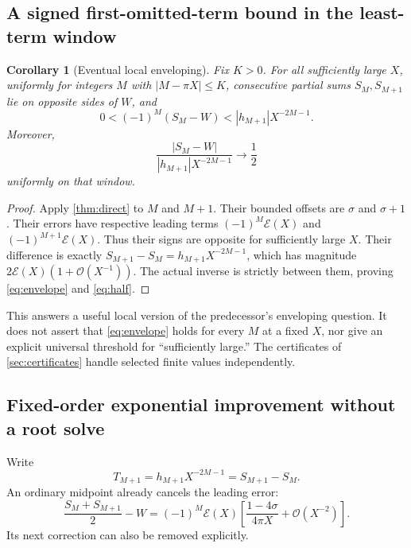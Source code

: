 \documentclass[11pt,a4paper]{article}
\newtheorem{corollary}[theorem]{Corollary}
\theoremstyle{definition}
\numberwithin{equation}{section}
\newcommand{\Oh}{\mathcal O}
\newcommand{\scal}{\mathcal E}
\begin{document}
\subsection{A signed first-omitted-term bound in the least-term window}
\begin{corollary}[Eventual local enveloping]
\label{cor:enveloping}
Fix $K>0$. For all sufficiently large $X$, uniformly for integers $M$ with $|M-\pi X|\le K$, consecutive partial sums $S_M,S_{M+1}$ lie on opposite sides of $W$, and
\begin{equation}
 0<(-1)^M(S_M-W)
       <|h_{M+1}|X^{-2M-1}.
 \label{eq:envelope}
\end{equation}
Moreover,
\begin{equation}
 \frac{|S_M-W|}{|h_{M+1}|X^{-2M-1}}\longrightarrow\frac12
 \label{eq:half}
\end{equation}
uniformly on that window.
\end{corollary}
\begin{proof}
Apply \cref{thm:direct} to $M$ and $M+1$. Their bounded offsets are $\sigma$ and $\sigma+1$. Their errors have respective leading terms $(-1)^M\scal(X)$ and $(-1)^{M+1}\scal(X)$. Thus their signs are opposite for sufficiently large $X$. Their difference is exactly
$S_{M+1}-S_M=h_{M+1}X^{-2M-1}$, which has magnitude $2\scal(X)(1+\Oh(X^{-1}))$. The actual inverse is strictly between them, proving \eqref{eq:envelope} and \eqref{eq:half}.
\end{proof}

This answers a useful local version of the predecessor's enveloping question. It does not assert that \eqref{eq:envelope} holds for every $M$ at a fixed $X$, nor give an explicit universal threshold for ``sufficiently large.'' The certificates of \cref{sec:certificates} handle selected finite values independently.

\subsection{Fixed-order exponential improvement without a root solve}
Write
\begin{equation}
 T_{M+1}=h_{M+1}X^{-2M-1}=S_{M+1}-S_M.
 \label{eq:Tnext}
\end{equation}
An ordinary midpoint already cancels the leading error:
\begin{equation}
 \frac{S_M+S_{M+1}}2-W
 =(-1)^M\scal(X)
 \left[\frac{1-4\sigma}{4\pi X}+\Oh(X^{-2})\right].
 \label{eq:midpoint}
\end{equation}
Its next correction can also be removed explicitly.
\end{document}
